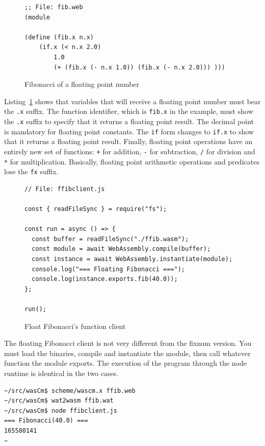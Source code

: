 \documentclass[a4paper,12pt]{book}
\begin{document}
\begin{figure}[!h]
\begin{verbatim}
;; File: fib.web
(module

(define (fib.x n.x)
    (if.x (< n.x 2.0)
        1.0
        (+ (fib.x (- n.x 1.0)) (fib.x (- n.x 2.0))) )))
\end{verbatim}
  \caption{Fibonacci of a floating point number}
  \label{wasm:float-fibonacci}
\end{figure}

Listing~\ref{wasm:float-fibonacci} shows that variables
that will receive a floating point number must bear
the \verb|.x| suffix. The function identifier, which is
\verb|fib.x| in the example, must show the \verb|.x|
suffix to specify that it returns a floating point result.
The decimal point is mandatory for floating point
constants. The \verb|if| form
changes to \verb|if.x| to show that it returns a
floating point result. Finally, floating point operations
have an entirely new set of functions: \verb|+| for
addition, \verb|-| for subtraction,
\verb|/| for division and \verb|*| for multiplication. 
Basically, floating point arithmetic operations 
and predicates lose the \verb|fx| suffix.

\begin{figure}[!h]
\begin{verbatim}
// File: ffibclient.js

const { readFileSync } = require("fs");

const run = async () => {
  const buffer = readFileSync("./ffib.wasm");
  const module = await WebAssembly.compile(buffer);
  const instance = await WebAssembly.instantiate(module);
  console.log("=== Floating Fibonacci ===");
  console.log(instance.exports.fib(40.0));
};

run();
\end{verbatim}
  \caption{Float Fibonacci's function client}
  \label{wasm:ffibclient}
\end{figure}

\newpage
The floating Fibonacci client is not very different
from the fixnum version. You must load the binaries,
compile and instantiate the module, then call
whatever function the module exports. The execution
of the program through the node runtime is identical
in the two cases.
\begin{verbatim}
~/src/wasCm$ scheme/wascm.x ffib.web
~/src/wasCm$ wat2wasm ffib.wat
~/src/wasCm$ node ffibclient.js
=== Fibonacci(40.0) ===
165580141
~
\end{verbatim}
\end{document}
